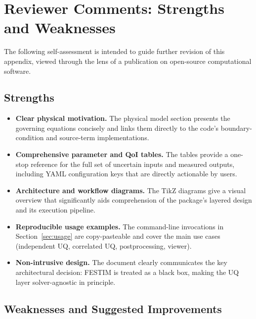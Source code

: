 \documentclass[11pt,a4paper]{article}
\begin{document}
\section{Reviewer Comments: Strengths and Weaknesses}
\label{sec:review}

The following self-assessment is intended to guide further revision of this
appendix, viewed through the lens of a publication on open-source
computational software.

\subsection{Strengths}

\begin{itemize}[nosep]
  \item \textbf{Clear physical motivation.}  The physical model section
    presents the governing equations concisely and links them directly to
    the code's boundary-condition and source-term implementations.
  \item \textbf{Comprehensive parameter and QoI tables.}  The tables
    provide a one-stop reference for the full set of uncertain inputs and
    measured outputs, including YAML configuration keys that are
    directly actionable by users.
  \item \textbf{Architecture and workflow diagrams.}  The TikZ diagrams
    give a visual overview that significantly aids comprehension of
    the package's layered design and its execution pipeline.
  \item \textbf{Reproducible usage examples.}  The command-line invocations
    in Section~\ref{sec:usage} are copy-pasteable and cover the main use
    cases (independent UQ, correlated UQ, postprocessing, viewer).
  \item \textbf{Non-intrusive design.}  The document clearly communicates
    the key architectural decision: FESTIM is treated as a black box,
    making the UQ layer solver-agnostic in principle.
\end{itemize}

\subsection{Weaknesses and Suggested Improvements}
\end{document}
